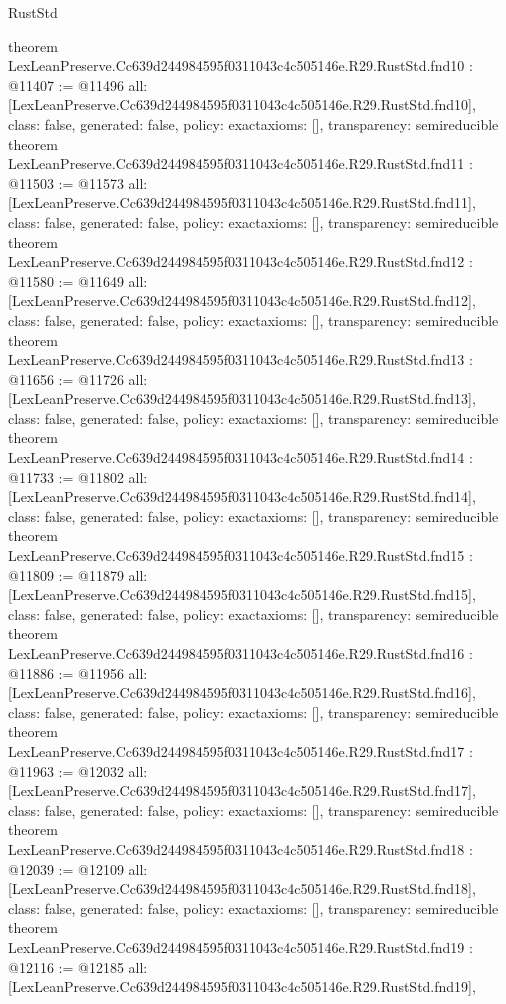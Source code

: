 \begin{lexlean}{RustStd}
\begin{coremodule}
{}
theorem LexLeanPreserve.Cc639d244984595f0311043c4c505146e.R29.RustStd.fnd10 : @11407 := @11496 {
  all: [LexLeanPreserve.Cc639d244984595f0311043c4c505146e.R29.RustStd.fnd10],
  class: false,
  generated: false,
  policy: exact{axioms: []},
  transparency: semireducible
}
theorem LexLeanPreserve.Cc639d244984595f0311043c4c505146e.R29.RustStd.fnd11 : @11503 := @11573 {
  all: [LexLeanPreserve.Cc639d244984595f0311043c4c505146e.R29.RustStd.fnd11],
  class: false,
  generated: false,
  policy: exact{axioms: []},
  transparency: semireducible
}
theorem LexLeanPreserve.Cc639d244984595f0311043c4c505146e.R29.RustStd.fnd12 : @11580 := @11649 {
  all: [LexLeanPreserve.Cc639d244984595f0311043c4c505146e.R29.RustStd.fnd12],
  class: false,
  generated: false,
  policy: exact{axioms: []},
  transparency: semireducible
}
theorem LexLeanPreserve.Cc639d244984595f0311043c4c505146e.R29.RustStd.fnd13 : @11656 := @11726 {
  all: [LexLeanPreserve.Cc639d244984595f0311043c4c505146e.R29.RustStd.fnd13],
  class: false,
  generated: false,
  policy: exact{axioms: []},
  transparency: semireducible
}
theorem LexLeanPreserve.Cc639d244984595f0311043c4c505146e.R29.RustStd.fnd14 : @11733 := @11802 {
  all: [LexLeanPreserve.Cc639d244984595f0311043c4c505146e.R29.RustStd.fnd14],
  class: false,
  generated: false,
  policy: exact{axioms: []},
  transparency: semireducible
}
theorem LexLeanPreserve.Cc639d244984595f0311043c4c505146e.R29.RustStd.fnd15 : @11809 := @11879 {
  all: [LexLeanPreserve.Cc639d244984595f0311043c4c505146e.R29.RustStd.fnd15],
  class: false,
  generated: false,
  policy: exact{axioms: []},
  transparency: semireducible
}
theorem LexLeanPreserve.Cc639d244984595f0311043c4c505146e.R29.RustStd.fnd16 : @11886 := @11956 {
  all: [LexLeanPreserve.Cc639d244984595f0311043c4c505146e.R29.RustStd.fnd16],
  class: false,
  generated: false,
  policy: exact{axioms: []},
  transparency: semireducible
}
theorem LexLeanPreserve.Cc639d244984595f0311043c4c505146e.R29.RustStd.fnd17 : @11963 := @12032 {
  all: [LexLeanPreserve.Cc639d244984595f0311043c4c505146e.R29.RustStd.fnd17],
  class: false,
  generated: false,
  policy: exact{axioms: []},
  transparency: semireducible
}
theorem LexLeanPreserve.Cc639d244984595f0311043c4c505146e.R29.RustStd.fnd18 : @12039 := @12109 {
  all: [LexLeanPreserve.Cc639d244984595f0311043c4c505146e.R29.RustStd.fnd18],
  class: false,
  generated: false,
  policy: exact{axioms: []},
  transparency: semireducible
}
theorem LexLeanPreserve.Cc639d244984595f0311043c4c505146e.R29.RustStd.fnd19 : @12116 := @12185 {
  all: [LexLeanPreserve.Cc639d244984595f0311043c4c505146e.R29.RustStd.fnd19],
}
\end{coremodule}
\end{lexlean}

